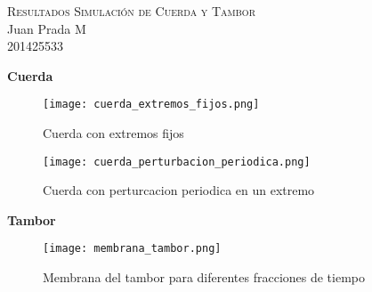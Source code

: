 \documentclass[]{article}
\begin{document}
\begin{center}
\textsc{\Huge Resultados Simulaci\'on de Cuerda y Tambor}\\[0.8cm]
\Large Juan Prada M \\[0.5cm]
\Large 201425533 \\[0.5cm]
\end{center}

\textbf{\LARGE {} Cuerda}\\[0.1cm]

\begin{figure}[!ht]
{
    \texttt{[image: cuerda\_extremos\_fijos.png]}
    \caption{Cuerda con extremos fijos}
}
\end{figure}

\begin{figure}[!ht]
{
    \texttt{[image: cuerda\_perturbacion\_periodica.png]}
    \caption{Cuerda con perturcacion periodica en un extremo}
}
\end{figure}

\newpage
\pagebreak

\textbf{\LARGE {} Tambor}\\[0.1cm]

\begin{figure}[!ht]
{
    \texttt{[image: membrana\_tambor.png]}
    \caption{Membrana del tambor para diferentes fracciones de tiempo}
}
\end{figure}
\end{document}
